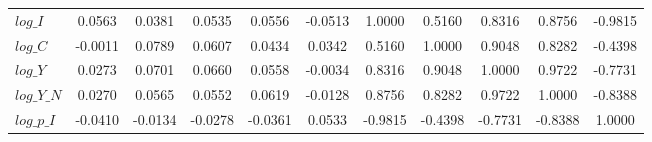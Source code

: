 \begin{center}
\begin{longtable}{lcccccccccc}
$log\_I          $	 & 	            0.0563	 & 	            0.0381	 & 	            0.0535	 & 	            0.0556	 & 	           -0.0513	 & 	            1.0000	 & 	            0.5160	 & 	            0.8316	 & 	            0.8756	 & 	           -0.9815 \\ 
$log\_C          $	 & 	           -0.0011	 & 	            0.0789	 & 	            0.0607	 & 	            0.0434	 & 	            0.0342	 & 	            0.5160	 & 	            1.0000	 & 	            0.9048	 & 	            0.8282	 & 	           -0.4398 \\ 
$log\_Y          $	 & 	            0.0273	 & 	            0.0701	 & 	            0.0660	 & 	            0.0558	 & 	           -0.0034	 & 	            0.8316	 & 	            0.9048	 & 	            1.0000	 & 	            0.9722	 & 	           -0.7731 \\ 
$log\_Y\_N       $	 & 	            0.0270	 & 	            0.0565	 & 	            0.0552	 & 	            0.0619	 & 	           -0.0128	 & 	            0.8756	 & 	            0.8282	 & 	            0.9722	 & 	            1.0000	 & 	           -0.8388 \\ 
$log\_p\_I       $	 & 	           -0.0410	 & 	           -0.0134	 & 	           -0.0278	 & 	           -0.0361	 & 	            0.0533	 & 	           -0.9815	 & 	           -0.4398	 & 	           -0.7731	 & 	           -0.8388	 & 	            1.0000 \\ 
\end{longtable}
 \end{center}
